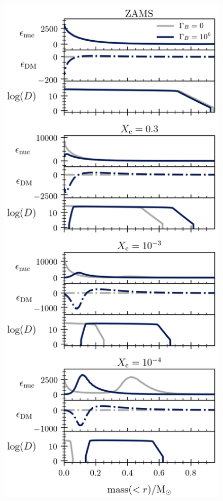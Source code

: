\documentclass[useAMS,usenatbib]{mnras}
\begin{document}
  \begin{figure}
    \centering
    \includegraphics[width=\textwidth]{plots/m3p5.png}

\end{figure}
\end{document}
